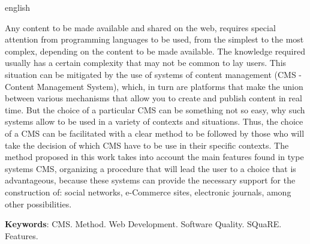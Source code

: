 \begin{resumo}[Abstract]
 \begin{otherlanguage*}{english}

Any content to be made available and shared on the web, requires special attention from programming languages to be used, from the simplest to the most complex, depending on the content to be made available. The knowledge required usually has a certain complexity that may not be common to lay users. This situation can be mitigated by the use of systems of content management (CMS - Content Management System), which, in turn are platforms that make the union between various mechanisms that allow you to create and publish content in real time. But the choice of a particular CMS can be something not so easy, why such systems allow to be used in a variety of contexts and situations. Thus, the choice of a CMS can be facilitated with a clear method to be followed by those who will take the decision of which CMS have to be use in their specific contexts. The method proposed in this work takes into account the main features found in type systems CMS, organizing a procedure that will lead the user to a choice that is advantageous, because these systems can provide the necessary support for the construction of: social networks, e-Commerce sites, electronic journals, among other possibilities.

   \vspace{\onelineskip}
   \noindent 
   \textbf{Keywords}: CMS. Method. Web Development.  Software Quality. SQuaRE. Features. 
 \end{otherlanguage*}
\end{resumo}
